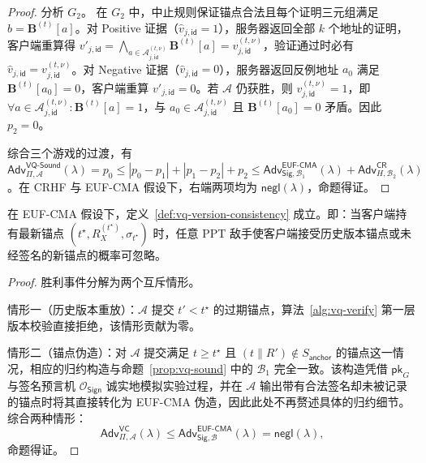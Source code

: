 \begin{proof}
分析 $G_2$。
在 $G_2$ 中，中止规则保证锚点合法且每个证明三元组满足 $b=\mathbf{B}^{(t)}[a]$。对 Positive 证据（$\widehat{v}_{j,\mathsf{id}}=1$），服务器返回全部 $k$ 个地址的证明，客户端重算得 $v'_{j,\mathsf{id}}=\bigwedge_{a\in\mathcal{A}_{j,\mathsf{id}}^{(t,\nu)}}\mathbf{B}^{(t)}[a]=v_{j,\mathsf{id}}^{(t,\nu)}$，验证通过时必有 $\widehat{v}_{j,\mathsf{id}}=v_{j,\mathsf{id}}^{(t,\nu)}$。对 Negative 证据（$\widehat{v}_{j,\mathsf{id}}=0$），服务器返回反例地址 $a_0$ 满足 $\mathbf{B}^{(t)}[a_0]=0$，客户端重算 $v'_{j,\mathsf{id}}=0$。若 $\mathcal{A}$ 仍获胜，则 $v_{j,\mathsf{id}}^{(t,\nu)}=1$，即 $\forall a\in\mathcal{A}_{j,\mathsf{id}}^{(t,\nu)}:\mathbf{B}^{(t)}[a]=1$，与 $a_0\in\mathcal{A}_{j,\mathsf{id}}^{(t,\nu)}$ 且 $\mathbf{B}^{(t)}[a_0]=0$ 矛盾。因此 $p_2=0$。

综合三个游戏的过渡，有 $\mathsf{Adv}_{\Pi,\mathcal{A}}^{\mathsf{VQ\text{-}Sound}}(\lambda) = p_0 \le |p_0-p_1|+|p_1-p_2|+p_2 \le \mathsf{Adv}_{\mathsf{Sig},\mathcal{B}_1}^{\mathsf{EUF\text{-}CMA}}(\lambda) + \mathsf{Adv}_{H,\mathcal{B}_2}^{\mathsf{CR}}(\lambda)$。在 CRHF 与 EUF-CMA 假设下，右端两项均为 $\mathsf{negl}(\lambda)$，命题得证。
\end{proof}

\begin{proposition}[版本一致性]\label{prop:vq-vc}
在 EUF-CMA 假设下，定义~\ref{def:vq-version-consistency} 成立。即：当客户端持有最新锚点 $(t^\star,R_X^{(t^\star)},\sigma_{t^\star})$ 时，任意 PPT 敌手使客户端接受历史版本锚点或未经签名的新锚点的概率可忽略。
\end{proposition}

\begin{proof}
胜利事件分解为两个互斥情形。

情形一（历史版本重放）：$\mathcal{A}$ 提交 $t'<t^\star$ 的过期锚点，算法~\ref{alg:vq-verify} 第一层版本校验直接拒绝，该情形贡献为零。

情形二（锚点伪造）：对 $\mathcal{A}$ 提交满足 $t\ge t^\star$ 且 $(t\|R')\notin S_{\mathsf{anchor}}$ 的锚点这一情况，相应的归约构造与命题~\ref{prop:vq-sound} 中的 $\mathcal{B}_1$ 完全一致。该构造凭借 $\mathsf{pk}_G$ 与签名预言机 $\mathcal{O}_{\mathsf{Sign}}$ 诚实地模拟实验过程，并在 $\mathcal{A}$ 输出带有合法签名却未被记录的锚点时将其直接转化为 EUF-CMA 伪造，因此此处不再赘述具体的归约细节。综合两种情形：
\begin{equation}
\mathsf{Adv}_{\Pi,\mathcal{A}}^{\mathsf{VC}}(\lambda) \le \mathsf{Adv}_{\mathsf{Sig},\mathcal{B}}^{\mathsf{EUF\text{-}CMA}}(\lambda) = \mathsf{negl}(\lambda)\text{,}
\end{equation}
命题得证。
\end{proof}

